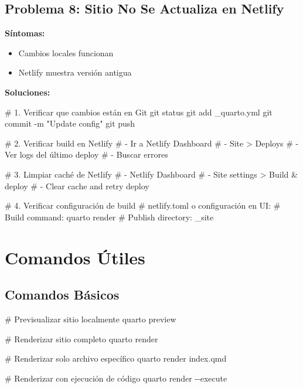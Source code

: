 \documentclass[
  doc,
  floatsintext,
  longtable,
  a4paper,
  nolmodern,
  notxfonts,
  notimes,
  12pt,
  colorlinks=true,linkcolor=blue,citecolor=blue,urlcolor=blue]{apa7}
\newenvironment{Shaded}{\begin{snugshade}}{\end{snugshade}}
\newcommand{\AttributeTok}[1]{\textcolor[rgb]{0.40,0.45,0.13}{#1}}
\newcommand{\CommentTok}[1]{\textcolor[rgb]{0.37,0.37,0.37}{#1}}
\newcommand{\ExtensionTok}[1]{\textcolor[rgb]{0.00,0.23,0.31}{#1}}
\newcommand{\FunctionTok}[1]{\textcolor[rgb]{0.28,0.35,0.67}{#1}}
\newcommand{\NormalTok}[1]{\textcolor[rgb]{0.00,0.23,0.31}{#1}}
\newcommand{\StringTok}[1]{\textcolor[rgb]{0.13,0.47,0.30}{#1}}
\providecommand{\tightlist}{%
  \setlength{\itemsep}{0pt}\setlength{\parskip}{0pt}}
\begin{document}
\subsection{Problema 8: Sitio No Se Actualiza en
Netlify}\label{problema-8-sitio-no-se-actualiza-en-netlify}

\textbf{Síntomas:}

\begin{itemize}
\tightlist
\item
  Cambios locales funcionan
\item
  Netlify muestra versión antigua
\end{itemize}

\textbf{Soluciones:}

\begin{Shaded}
\begin{Highlighting}[]
\CommentTok{\# 1. Verificar que cambios están en Git}
\FunctionTok{git}\NormalTok{ status}
\FunctionTok{git}\NormalTok{ add \_quarto.yml}
\FunctionTok{git}\NormalTok{ commit }\AttributeTok{{-}m} \StringTok{"Update config"}
\FunctionTok{git}\NormalTok{ push}

\CommentTok{\# 2. Verificar build en Netlify}
\CommentTok{\# {-} Ir a Netlify Dashboard}
\CommentTok{\# {-} Site \textgreater{} Deploys}
\CommentTok{\# {-} Ver logs del último deploy}
\CommentTok{\# {-} Buscar errores}

\CommentTok{\# 3. Limpiar caché de Netlify}
\CommentTok{\# {-} Netlify Dashboard}
\CommentTok{\# {-} Site settings \textgreater{} Build \& deploy}
\CommentTok{\# {-} Clear cache and retry deploy}

\CommentTok{\# 4. Verificar configuración de build}
\CommentTok{\# netlify.toml o configuración en UI:}
\CommentTok{\# Build command: quarto render}
\CommentTok{\# Publish directory: \_site}
\end{Highlighting}
\end{Shaded}

\section{Comandos Útiles}\label{comandos-uxfatiles}

\subsection{Comandos Básicos}\label{comandos-buxe1sicos}

\begin{Shaded}
\begin{Highlighting}[]
\CommentTok{\# Previsualizar sitio localmente}
\ExtensionTok{quarto}\NormalTok{ preview}

\CommentTok{\# Renderizar sitio completo}
\ExtensionTok{quarto}\NormalTok{ render}

\CommentTok{\# Renderizar solo archivo específico}
\ExtensionTok{quarto}\NormalTok{ render index.qmd}

\CommentTok{\# Renderizar con ejecución de código}
\ExtensionTok{quarto}\NormalTok{ render }\AttributeTok{{-}{-}execute}
\end{Highlighting}
\end{Shaded}
\end{document}
